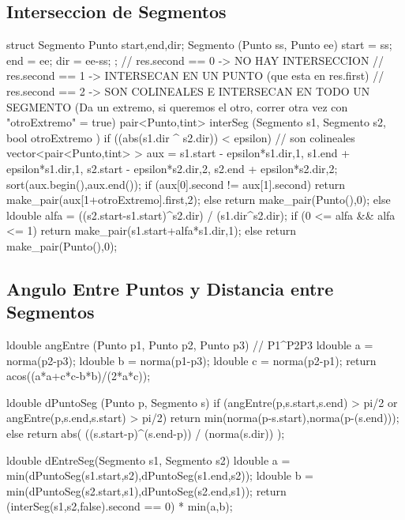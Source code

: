 \subsection{Interseccion de Segmentos}
\begin{code}
struct Segmento
{
	Punto start,end,dir;
	Segmento (Punto ss, Punto ee)
	{
		start = ss;
		end = ee;
		dir = ee-ss;
	}
};
// res.second == 0 -> NO HAY INTERSECCION
// res.second == 1 -> INTERSECAN EN UN PUNTO (que esta en res.first)
// res.second == 2 -> SON COLINEALES E INTERSECAN EN TODO UN SEGMENTO (Da un extremo, si queremos el otro, correr otra vez con "otroExtremo" = true)
pair<Punto,tint> interSeg (Segmento s1, Segmento s2, bool otroExtremo ) 
{
	if ((abs(s1.dir ^ s2.dir)) < epsilon) // son colineales
	{
		vector<pair<Punto,tint> > aux = {{s1.start - epsilon*s1.dir,1},
																	 	 {s1.end   + epsilon*s1.dir,1},
															 			 {s2.start - epsilon*s2.dir,2},
															 			 {s2.end   + epsilon*s2.dir,2}};
		sort(aux.begin(),aux.end());
		if (aux[0].second != aux[1].second)
			return make_pair(aux[1+otroExtremo].first,2);
		else
			return make_pair(Punto(),0);
	}
	else
	{
		ldouble alfa = ((s2.start-s1.start)^s2.dir) / (s1.dir^s2.dir);
		if (0 <= alfa && alfa <= 1)
			return make_pair(s1.start+alfa*s1.dir,1);
		else
			return make_pair(Punto(),0);
	}
}
\end{code}

\subsection{Angulo Entre Puntos y Distancia entre Segmentos}
\begin{code}
ldouble angEntre (Punto p1, Punto p2, Punto p3) // P1^P2P3
{
	ldouble a = norma(p2-p3);
	ldouble b = norma(p1-p3);
	ldouble c = norma(p2-p1);
	return acos((a*a+c*c-b*b)/(2*a*c));
}

ldouble dPuntoSeg (Punto p, Segmento s)
{
	if (angEntre(p,s.start,s.end) > pi/2 or angEntre(p,s.end,s.start) > pi/2)
		return min(norma(p-s.start),norma(p-(s.end)));
	else
		return abs( ((s.start-p)^(s.end-p)) / (norma(s.dir)) );
}

ldouble dEntreSeg(Segmento s1, Segmento s2)
{
	ldouble a = min(dPuntoSeg(s1.start,s2),dPuntoSeg(s1.end,s2));
	ldouble b = min(dPuntoSeg(s2.start,s1),dPuntoSeg(s2.end,s1));
	return (interSeg(s1,s2,false).second == 0) * min(a,b);
}
\end{code}

